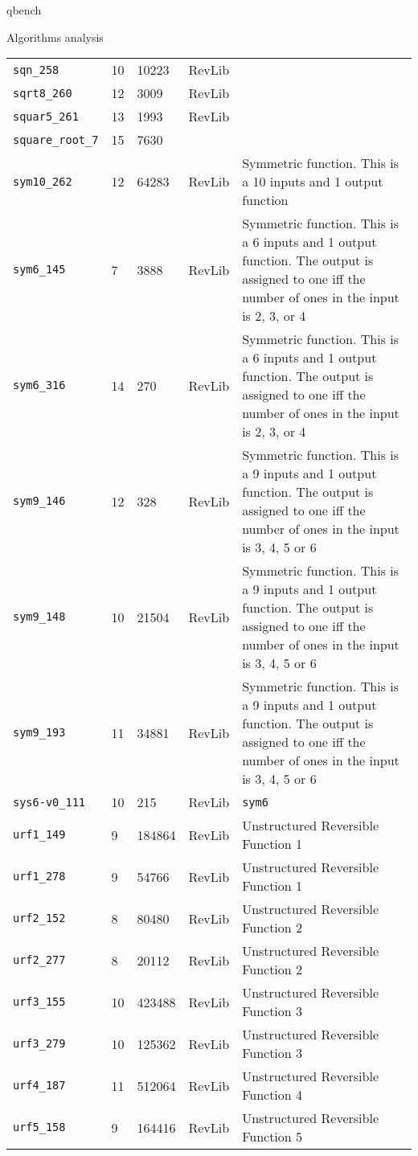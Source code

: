 \documentclass[11pt]{beamer}
\begin{document}
\begin{frame}[fragile,label={sec:org639c711}]{qbench}
\begin{block}{Algorithms analysis}
\begin{table}[htbp]
\begin{tabular}{|p{3cm}|p{1.5cm}|p{1cm}|p{1cm}|p{7.5cm}|}
\texttt{sqn\_258} & 10 & 10223 & RevLib & \\
\texttt{sqrt8\_260} & 12 & 3009 & RevLib & \\
\texttt{squar5\_261} & 13 & 1993 & RevLib & \\
\texttt{square\_root\_7} & 15 & 7630 &  & \\
\texttt{sym10\_262} & 12 & 64283 & RevLib & Symmetric function. This is a 10 inputs and 1 output function\\
\texttt{sym6\_145} & 7 & 3888 & RevLib & Symmetric function. This is a 6 inputs and 1 output function. The output is assigned to one iff the number of ones in the input is 2, 3, or 4\\
\texttt{sym6\_316} & 14 & 270 & RevLib & Symmetric function. This is a 6 inputs and 1 output function. The output is assigned to one iff the number of ones in the input is 2, 3, or 4\\
\texttt{sym9\_146} & 12 & 328 & RevLib & Symmetric function. This is a 9 inputs and 1 output function. The output is assigned to one iff the number of ones in the input is 3, 4, 5 or 6\\
\texttt{sym9\_148} & 10 & 21504 & RevLib & Symmetric function. This is a 9 inputs and 1 output function. The output is assigned to one iff the number of ones in the input is 3, 4, 5 or 6\\
\texttt{sym9\_193} & 11 & 34881 & RevLib & Symmetric function. This is a 9 inputs and 1 output function. The output is assigned to one iff the number of ones in the input is 3, 4, 5 or 6\\
\texttt{sys6-v0\_111} & 10 & 215 & RevLib & \texttt{sym6}\\
\texttt{urf1\_149} & 9 & 184864 & RevLib & Unstructured Reversible Function 1\\
\texttt{urf1\_278} & 9 & 54766 & RevLib & Unstructured Reversible Function 1\\
\texttt{urf2\_152} & 8 & 80480 & RevLib & Unstructured Reversible Function 2\\
\texttt{urf2\_277} & 8 & 20112 & RevLib & Unstructured Reversible Function 2\\
\texttt{urf3\_155} & 10 & 423488 & RevLib & Unstructured Reversible Function 3\\
\texttt{urf3\_279} & 10 & 125362 & RevLib & Unstructured Reversible Function 3\\
\texttt{urf4\_187} & 11 & 512064 & RevLib & Unstructured Reversible Function 4\\
\texttt{urf5\_158} & 9 & 164416 & RevLib & Unstructured Reversible Function 5\\

\end{tabular}
\end{table}
\end{block}
\end{frame}
\end{document}
